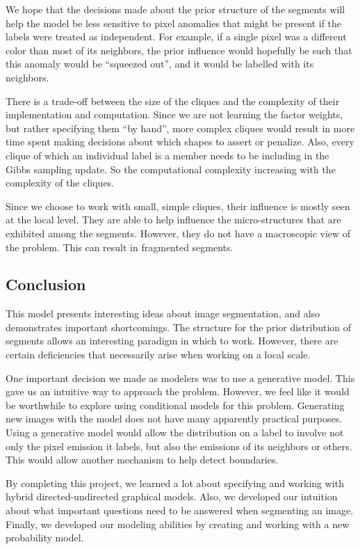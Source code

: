 \documentclass[12pt]{article}
\begin{document}
We hope that the decisions made about the prior structure of the segments will
help the model be less sensitive to pixel anomalies that might be present if
the labels were treated as independent. For example, if a single pixel was a
different color than most of its neighbors, the prior influence would hopefully
be such that this anomaly would be ``squeezed out'', and it would be labelled
with its neighbors.

There is a trade-off between the size of the cliques and the complexity of their
implementation and computation. Since we are not learning the factor weights,
but rather specifying them ``by hand'', more complex cliques would result in
more time spent making decisions about which shapes to assert or penalize.
Also, every clique of which an individual label is a member needs to be
including in the Gibbs sampling update. So the computational complexity
increasing with the complexity of the cliques.

Since we choose to work with small, simple cliques, their influence is mostly
seen at the local level. They are able to help influence the micro-structures
that are exhibited among the segments. However, they do not have a macroscopic
view of the problem. This can result in fragmented segments.

\subsection*{Conclusion}
This model presents interesting ideas about image segmentation, and also
demonstrates important shortcomings. The structure for the prior distribution
of segments allows an interesting paradigm in which to work. However, there are
certain deficiencies that necessarily arise when working on a local scale.

One important decision we made as modelers was to use a generative model. This
gave us an intuitive way to approach the problem. However, we feel like it
would be worthwhile to explore using conditional models for this problem.
Generating new images with the model does not have many apparently practical
purposes. Using a generative model would allow the distribution on a label to
involve not only the pixel emission it labels, but also the emissions of its
neighbors or others. This would allow another mechanism to help detect
boundaries.

By completing this project, we learned a lot about specifying and working with
hybrid directed-undirected graphical models. Also, we developed our intuition
about what important questions need to be answered when segmenting an image.
Finally, we developed our modeling abilities by creating and working with a new
probability model.
\end{document}
